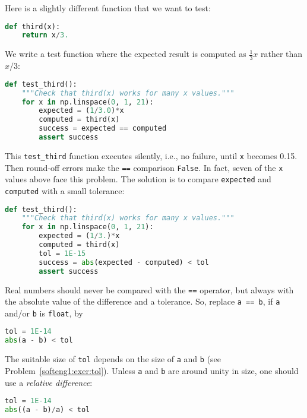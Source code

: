 \documentclass[graybox,sectrefs,envcountresetchap,open=right,final]{svmonodo}
\newenvironment{notice_mdfboxadmon}[1][]{
\begin{notice_mdfboxmdframed}[frametitle=#1]
}
{
\end{notice_mdfboxmdframed}
}
\begin{document}
Here is a slightly different function that
we want to test:

\begin{lstlisting}[language=Python,style=blue1_bluegreen]
def third(x):
    return x/3.
\end{lstlisting}
We write a test function where the expected result is computed as
$\frac{1}{3}x$ rather than $x/3$:

\begin{lstlisting}[language=Python,style=blue1_bluegreen]
def test_third():
    """Check that third(x) works for many x values."""
    for x in np.linspace(0, 1, 21):
        expected = (1/3.0)*x
        computed = third(x)
        success = expected == computed
        assert success
\end{lstlisting}
This \Verb!test_third! function executes silently, i.e., no failure,
until \texttt{x} becomes 0.15. Then round-off errors make the \texttt{==} comparison
\texttt{False}. In fact, seven of the \texttt{x} values above face this problem.
The solution is to compare \texttt{expected} and \texttt{computed}
with a small tolerance:

\begin{lstlisting}[language=Python,style=blue1_bluegreen]
def test_third():
    """Check that third(x) works for many x values."""
    for x in np.linspace(0, 1, 21):
        expected = (1/3.)*x
        computed = third(x)
        tol = 1E-15
        success = abs(expected - computed) < tol
        assert success
\end{lstlisting}



\begin{notice_mdfboxadmon}
Real numbers should never be compared with the \texttt{==} operator, but always
with the absolute value of the difference and a tolerance.
So, replace \texttt{a == b}, if \texttt{a} and/or \texttt{b} is \texttt{float}, by

\begin{lstlisting}[language=Python,style=blue1_bluegreen]
tol = 1E-14
abs(a - b) < tol
\end{lstlisting}
The suitable size of \texttt{tol} depends on the size of \texttt{a} and \texttt{b}
(see Problem~\ref{softeng1:exer:tol}). Unless \texttt{a} and \texttt{b} are around
unity in size, one should use a \emph{relative difference}:

\begin{lstlisting}[language=Python,style=blue1_bluegreen]
tol = 1E-14
abs((a - b)/a) < tol
\end{lstlisting}
\end{notice_mdfboxadmon}
\end{document}
